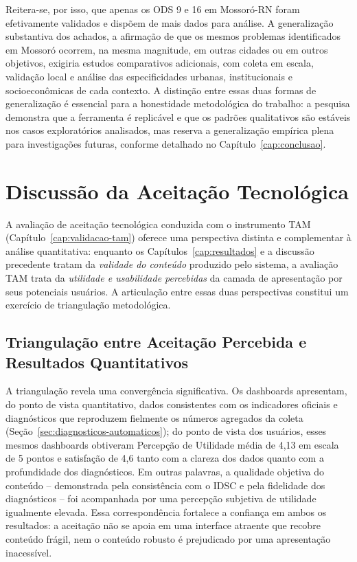 Reitera-se, por isso, que apenas os ODS 9 e 16 em Mossoró-RN foram efetivamente validados e dispõem de mais dados para análise. A generalização substantiva dos achados, a afirmação de que os mesmos problemas identificados em Mossoró ocorrem, na mesma magnitude, em outras cidades ou em outros objetivos, exigiria estudos comparativos adicionais, com coleta em escala, validação local e análise das especificidades urbanas, institucionais e socioeconômicas de cada contexto. A distinção entre essas duas formas de generalização é essencial para a honestidade metodológica do trabalho: a pesquisa demonstra que a ferramenta é replicável e que os padrões qualitativos são estáveis nos casos exploratórios analisados, mas reserva a generalização empírica plena para investigações futuras, conforme detalhado no Capítulo~\ref{cap:conclusao}.

\section{Discussão da Aceitação Tecnológica}
\label{sec:disc-tam}

A avaliação de aceitação tecnológica conduzida com o instrumento TAM (Capítulo~\ref{cap:validacao-tam}) oferece uma perspectiva distinta e complementar à análise quantitativa: enquanto os Capítulos~\ref{cap:resultados} e a discussão precedente tratam da \textit{validade do conteúdo} produzido pelo sistema, a avaliação TAM trata da \textit{utilidade e usabilidade percebidas} da camada de apresentação por seus potenciais usuários. A articulação entre essas duas perspectivas constitui um exercício de triangulação metodológica.

\subsection{Triangulação entre Aceitação Percebida e Resultados Quantitativos}
\label{subsec:disc-triangulacao}

A triangulação revela uma convergência significativa. Os dashboards apresentam, do ponto de vista quantitativo, dados consistentes com os indicadores oficiais e diagnósticos que reproduzem fielmente os números agregados da coleta (Seção~\ref{sec:diagnosticos-automaticos}); do ponto de vista dos usuários, esses mesmos dashboards obtiveram Percepção de Utilidade média de 4,13 em escala de 5 pontos e satisfação de 4,6 tanto com a clareza dos dados quanto com a profundidade dos diagnósticos. Em outras palavras, a qualidade objetiva do conteúdo -- demonstrada pela consistência com o IDSC e pela fidelidade dos diagnósticos -- foi acompanhada por uma percepção subjetiva de utilidade igualmente elevada. Essa correspondência fortalece a confiança em ambos os resultados: a aceitação não se apoia em uma interface atraente que recobre conteúdo frágil, nem o conteúdo robusto é prejudicado por uma apresentação inacessível.

